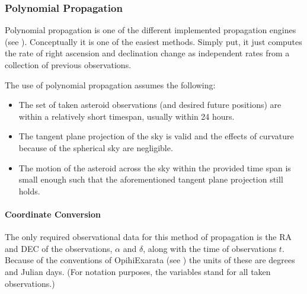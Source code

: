 \documentclass[letterpaper,11pt,english]{sphinxmanual}
\begin{document}
\subsubsection{Polynomial Propagation}
\label{\detokenize{technical/algorithms/polynomial_propagation:polynomial-propagation}}\label{\detokenize{technical/algorithms/polynomial_propagation:technical-algorithms-polynomial-propagation}}\label{\detokenize{technical/algorithms/polynomial_propagation::doc}}
\sphinxAtStartPar
Polynomial propagation is one of the different implemented propagation engines
(see {\hyperref[\detokenize{technical/architecture/services_engines:technical-architecture-services-engines}]{}}). Conceptually it is one
of the easiest methods. Simply put, it just computes the rate of right
ascension and declination change as independent rates from a collection of
previous observations.

\sphinxAtStartPar
The use of polynomial propagation assumes the following:
\begin{itemize}
\item {} 
\sphinxAtStartPar
The set of taken asteroid observations (and desired future positions) are within a relatively short timespan, usually within 24 hours.

\item {} 
\sphinxAtStartPar
The tangent plane projection of the sky is valid and the effects of curvature because of the spherical sky are negligible.

\item {} 
\sphinxAtStartPar
The motion of the asteroid across the sky within the provided time span is small enough such that the aforementioned tangent plane projection still holds.

\end{itemize}


\paragraph{Coordinate Conversion}
\label{\detokenize{technical/algorithms/polynomial_propagation:coordinate-conversion}}
\sphinxAtStartPar
The only required observational data for this method of propagation is the
RA and DEC of the observations, \(\alpha\) and \(\delta\), along with
the time of observations \(t\). Because of the conventions of OpihiExarata
(see {\hyperref[\detokenize{technical/conventions:technical-conventions}]{}}) the units of these are degrees and Julian
days. (For notation purposes, the variables stand for all taken observations.)
\end{document}
